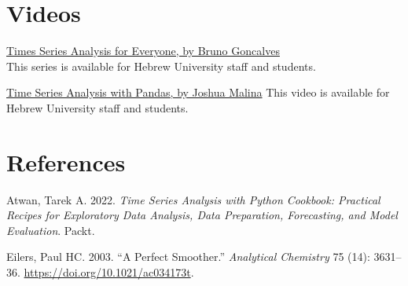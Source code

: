 \documentclass[
  letterpaper,
  DIV=11,
  numbers=noendperiod,
  oneside]{scrreprt}
\newlength{\cslhangindent}
\newlength{\cslentryspacingunit} %
\newenvironment{CSLReferences}[2] %
 {%
  \setlength{\parindent}{0pt}
  \ifodd #1
  \let\oldpar\par
  \def\par{\hangindent=\cslhangindent\oldpar}
  \fi
  \setlength{\parskip}{#2\cslentryspacingunit}
 }%
 {}
\begin{document}
\hypertarget{videos}{%
\section*{Videos}\label{videos}}


\href{https://learning.oreilly.com/videos/times-series-analysis/9780136944515/}{Times
Series Analysis for Everyone, by Bruno Goncalves}\\
This series is available for Hebrew University staff and students.

\href{https://learning.oreilly.com/videos/time-series-analysis/00000G9DZPO7DJKE/}{Time
Series Analysis with Pandas, by Joshua Malina} This video is available
for Hebrew University staff and students.

\hypertarget{references}{%
\section*{References}\label{references}}


\hypertarget{refs}{}
\begin{CSLReferences}{1}{0}
\leavevmode{}%
Atwan, Tarek A. 2022. \emph{Time Series Analysis with Python Cookbook:
Practical Recipes for Exploratory Data Analysis, Data Preparation,
Forecasting, and Model Evaluation}. Packt.

\leavevmode{}%
Eilers, Paul HC. 2003. {``A Perfect Smoother.''} \emph{Analytical
Chemistry} 75 (14): 3631--36. \url{https://doi.org/10.1021/ac034173t}.

\end{CSLReferences}
\end{document}
